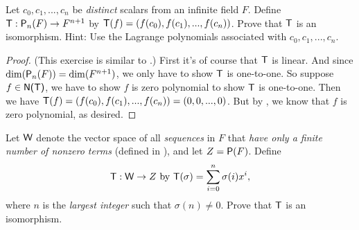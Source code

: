 \begin{exercise} \label{exercise 2.4.22}
Let \(c_0, c_1, ..., c_n\) be \emph{distinct} scalars from an infinite field \(F\).
Define \(\textsf{T}: \textsf{P}_n(F) \to F^{n + 1}\) by \(\textsf{T}(f) = (f(c_0), f(c_1), ..., f(c_n))\).
Prove that \(\textsf{T}\) is an isomorphism.
Hint: Use the Lagrange polynomials associated with \(c_0, c_1, ..., c_n\).
\end{exercise}

\begin{proof}
(This exercise is similar to .)
First it's of course that \(\textsf{T}\) is linear.
And since \(\dim(\textsf{P}_n(F)) = \dim(F^{n + 1})\), we only have to show \(\textsf{T}\) is one-to-one.
So suppose \(f \in \textsf{N(T)}\), we have to show \(f\) is zero polynomial to show \(\textsf{T}\) is one-to-one.
Then we have \(\textsf{T}(f) = (f(c_0), f(c_1), ..., f(c_n)) = (0, 0, ..., 0)\).
But by , we know that \(f\) is zero polynomial, as desired.
\end{proof}

\begin{exercise} \label{exercise 2.4.23}
Let \(\textsf{W}\) denote the vector space of all \emph{sequences} in \(F\) that \emph{have only a finite number of nonzero terms} (defined in ),
and let \(Z = \textsf{P}(F)\).
Define
\[
    \textsf{T} : \textsf{W} \to Z \text{ by } \textsf{T}(\sigma) = \sum_{i = 0}^n \sigma(i)x^i,
\]
where \(n\) is the \emph{largest integer} such that \(\sigma(n) \ne 0\). Prove that \(\textsf{T}\) is an isomorphism.
\end{exercise}

